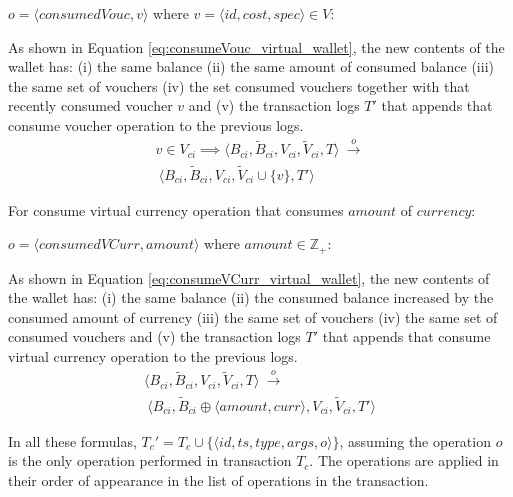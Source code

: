 \begin{enumerate}
	$o = \langle consumedVouc, v \rangle$ where $v=\langle id, cost, spec \rangle  \in V$:
	
	As shown in Equation \ref{eq:consumeVouc_virtual_wallet}, the new contents of the wallet has: (i) the same balance (ii) the same amount of consumed balance (iii) the same set of vouchers (iv) the set consumed vouchers together with that recently consumed voucher $v$ and (v) the transaction logs $T'$ that appends that consume voucher operation to the previous logs.		
	\begin{multline} \label{eq:consumeVouc_virtual_wallet}
		 v \in V_{ci} \implies 
	    \langle B_{ci}, \widetilde{B}_{ci}, V_{ci}, \widetilde{V}_{ci}, T \rangle ~ \overset{o}{\rightarrow} \\
	     ~ \langle B_{ci}, \widetilde{B}_{ci}, V_{ci}, \widetilde{V}_{ci} \cup \{v\}, T' \rangle 	
	\end{multline}
	
	For consume virtual currency operation that consumes $amount$ of $currency$:
	
	$o = \langle consumedVCurr, amount \rangle$ where $amount \in \mathbb{Z}_{+}$:
	
	As shown in Equation \ref{eq:consumeVCurr_virtual_wallet}, the new contents of the wallet has: (i) the same balance (ii) the consumed balance increased by the consumed amount of currency (iii) the same set of vouchers (iv) the same set of consumed vouchers and (v) the transaction logs $T'$ that appends that consume virtual currency operation to the previous logs.
	\begin{multline} \label{eq:consumeVCurr_virtual_wallet}
	    \langle B_{ci}, \widetilde{B}_{ci}, V_{ci}, \widetilde{V}_{ci}, T \rangle ~ \overset{o}{\rightarrow} \\
	    ~ \langle B_{ci}, \widetilde{B}_{ci} \oplus \langle amount, curr \rangle, V_{ci}, \widetilde{V}_{ci}, T' \rangle 	
	\end{multline}
	
	In all these formulas, $T_{c}'=T_{c} \cup \{ \langle id, ts, type, args, o \rangle \}$, assuming the operation $o$ is the only operation performed in transaction $T_{c}$. The operations are applied in their order of appearance in the list of operations in the transaction.
\end{enumerate}
